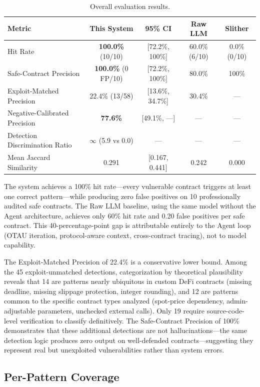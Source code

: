 \documentclass[10pt]{article}
\begin{document}
\begin{table}[H]
\centering
\caption{Overall evaluation results.}
\label{tab:overall}
\small
\begin{tabular}{lcccc}
\toprule
Metric & This System & 95\% CI & Raw LLM & Slither \\
\midrule
Hit Rate & \textbf{100.0\%} (10/10) & [72.2\%, 100\%] & 60.0\% (6/10) & 0.0\% (0/10) \\
Safe-Contract Precision & \textbf{100.0\%} (0 FP/10) & [72.2\%, 100\%] & 80.0\% & 100\% \\
Exploit-Matched Precision & 22.4\% (13/58) & [13.6\%, 34.7\%] & 30.4\% & --- \\
Negative-Calibrated Precision & \textbf{77.6\%} & [49.1\%, ---] & --- & --- \\
Detection Discrimination Ratio & \textbf{$\infty$} (5.9 vs 0.0) & --- & --- & --- \\
Mean Jaccard Similarity & 0.291 & [0.167, 0.441] & 0.242 & 0.000 \\
\bottomrule
\end{tabular}
\end{table}

The system achieves a 100\% hit rate---every vulnerable contract triggers at least one correct pattern---while producing zero false positives on 10 professionally audited safe contracts. The Raw LLM baseline, using the same model without the Agent architecture, achieves only 60\% hit rate and 0.20 false positives per safe contract. This 40-percentage-point gap is attributable entirely to the Agent loop (OTAU iteration, protocol-aware context, cross-contract tracing), not to model capability.

The Exploit-Matched Precision of 22.4\% is a conservative lower bound. Among the 45 exploit-unmatched detections, categorization by theoretical plausibility reveals that 14 are patterns nearly ubiquitous in custom DeFi contracts (missing deadline, missing slippage protection, integer rounding), and 12 are patterns common to the specific contract types analyzed (spot-price dependency, admin-adjustable parameters, unchecked external calls). Only 19 require source-code-level verification to classify definitively. The Safe-Contract Precision of 100\% demonstrates that these additional detections are not hallucinations---the same detection logic produces zero output on well-defended contracts---suggesting they represent real but unexploited vulnerabilities rather than system errors.

\subsection{Per-Pattern Coverage}
\end{document}

